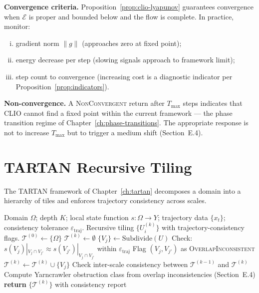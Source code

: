 \documentclass[11pt,openany]{book}
\begin{document}
\textbf{Convergence criteria.}
Proposition~\ref{prop:clio-lyapunov} guarantees convergence
when $\mathcal{E}$ is proper and bounded below and the flow
is complete.  In practice, monitor:
\begin{enumerate}[(i)]
  \item gradient norm $\|g\|$ (approaches zero at
    fixed point);
  \item energy decrease per step (slowing signals
    approach to framework limit);
  \item step count to convergence (increasing cost is a
    diagnostic indicator per
    Proposition~\ref{prop:indicators}).
\end{enumerate}

\textbf{Non-convergence.} A \textsc{NonConvergent} return
after $T_{\max}$ steps indicates that CLIO cannot find a
fixed point within the current framework — the phase
transition regime of Chapter~\ref{ch:phase-transitions}.
The appropriate response is not to increase $T_{\max}$
but to trigger a medium shift (Section~E.4).

\section{TARTAN Recursive Tiling}
\label{sec:tartan-impl}

The TARTAN framework of Chapter~\ref{ch:tartan} decomposes
a domain into a hierarchy of tiles and enforces trajectory
consistency across scales.

\begin{algorithm}
\caption{TARTAN Tiling with Trajectory Consistency}
\label{alg:tartan}
\begin{algorithmic}
\Require Domain $\Omega$; depth $K$; local state function
  $s : \Omega \to Y$; trajectory data $\{x_t\}$;
  consistency tolerance $\varepsilon_{\mathrm{traj}}$.
\Ensure Recursive tiling $\{U_{i}^{(k)}\}$ with
  trajectory-consistency flags.
\State $\mathcal{T}^{(0)} \gets \{\Omega\}$
  \State $\mathcal{T}^{(k)} \gets \emptyset$
    \State $\{V_j\} \gets \mathrm{Subdivide}(U)$
      \State Check: $s(V_j)|_{V_j \cap V_{j'}} \approx
        s(V_{j'})|_{V_j \cap V_{j'}}$ within $\varepsilon_{\mathrm{traj}}$
        \State Flag $(V_j, V_{j'})$ as
          \textsc{OverlapInconsistent}
      \EndIf
    \EndFor
    \State $\mathcal{T}^{(k)} \gets \mathcal{T}^{(k)} \cup \{V_j\}$
  \EndFor
  \State Check inter-scale consistency between
    $\mathcal{T}^{(k-1)}$ and $\mathcal{T}^{(k)}$
\EndFor
\State Compute Yarncrawler obstruction class from
  overlap inconsistencies (Section~E.4)
\State \textbf{return} $\{\mathcal{T}^{(k)}\}$ with
  consistency report
\end{algorithmic}
\end{algorithm}
\end{document}
